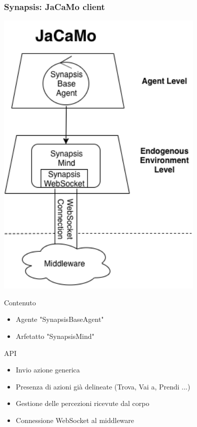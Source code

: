 \documentclass[handout]{beamer}\mode<presentation>{\usetheme{AMSCesenaBleu}}
\begin{document}
\begin{frame}[fragile]

\frametitle[Synapsis, Liberie JaCaMo e Unity]{Synapsis: JaCaMo client}

\begin{minipage}{0.48\linewidth}
    \centering
\includegraphics[width=0.75\textwidth]{figures/struttura_libreria_JaCaMo.png}
\end{minipage}
\begin{minipage}{0.48\linewidth}
    \begin{block}{Contenuto}
    \begin{itemize}
        \item Agente "SynapsisBaseAgent"
        \item Arfetatto "SynapsisMind"
    \end{itemize}
    \end{block}
    \begin{block}{API}
    \begin{itemize}
        \item Invio azione generica
        \item Presenza di azioni già delineate (Trova, Vai a, Prendi ...)
        \item Gestione delle percezioni ricevute dal corpo
        \item Connessione WebSocket al middleware
    \end{itemize}
    \end{block}
\end{minipage}

\end{frame}
\end{document}
